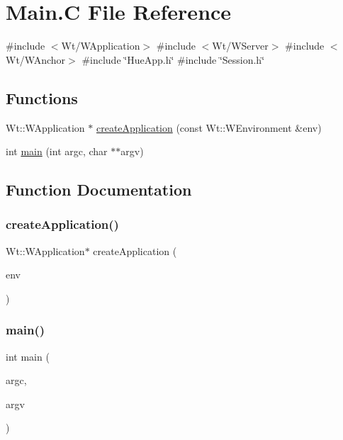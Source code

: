 \hypertarget{_main_8_c}{}\section{Main.\+C File Reference}
\label{_main_8_c}
{\ttfamily \#include $<$Wt/\+W\+Application$>$}\newline
{\ttfamily \#include $<$Wt/\+W\+Server$>$}\newline
{\ttfamily \#include $<$Wt/\+W\+Anchor$>$}\newline
{\ttfamily \#include \char`\"{}Hue\+App.\+h\char`\"{}}\newline
{\ttfamily \#include \char`\"{}Session.\+h\char`\"{}}\newline
\subsection*{Functions}
\begin{DoxyCompactItemize}
\item 
Wt\+::\+W\+Application $\ast$ \hyperlink{_main_8_c_ae1aa0ff35ce684521720eff1477893fd}{create\+Application} (const Wt\+::\+W\+Environment \&env)
\item 
int \hyperlink{_main_8_c_a3c04138a5bfe5d72780bb7e82a18e627}{main} (int argc, char $\ast$$\ast$argv)
\end{DoxyCompactItemize}


\subsection{Function Documentation}
\mbox{\label{_main_8_c_ae1aa0ff35ce684521720eff1477893fd}} 
\subsubsection{\texorpdfstring{create\+Application()}{createApplication()}}
{\footnotesize\ttfamily Wt\+::\+W\+Application$\ast$ create\+Application (\begin{DoxyParamCaption}\item[{const Wt\+::\+W\+Environment \&}]{env }\end{DoxyParamCaption})}

\mbox{\label{_main_8_c_a3c04138a5bfe5d72780bb7e82a18e627}} 
\subsubsection{\texorpdfstring{main()}{main()}}
{\footnotesize\ttfamily int main (\begin{DoxyParamCaption}\item[{int}]{argc,  }\item[{char $\ast$$\ast$}]{argv }\end{DoxyParamCaption})}

